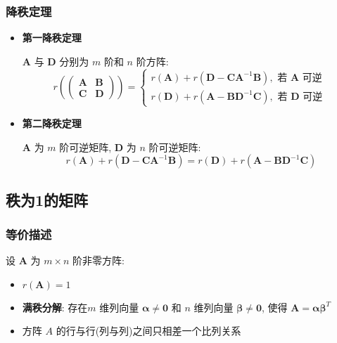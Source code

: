\documentclass{article}
\begin{document}
			\subsubsection{降秩定理}
				\begin{itemize}
					\item \textbf{第一降秩定理}

						$\boldsymbol{A}$ 与 $\boldsymbol{D}$ 分别为 $m$ 阶和 $n$ 阶方阵:
						$$
						r\left(\left(\begin{array}{ll}
							\boldsymbol{A} & \boldsymbol{B} \\
							\boldsymbol{C} & \boldsymbol{D}
						\end{array}\right)\right)=\left\{\begin{array}{l}
							r(\boldsymbol{A})+r\left(\boldsymbol{D}-\boldsymbol{C A}^{-1} \boldsymbol{B}\right), \text { 若 } \boldsymbol{A} \text { 可逆 } \\
							r(\boldsymbol{D})+r\left(\boldsymbol{A}-\boldsymbol{B} \boldsymbol{D}^{-1} \boldsymbol{C}\right), \text { 若 } \boldsymbol{D} \text { 可逆 }
						\end{array}\right.
						$$
					\item \textbf{第二降秩定理}

						$\boldsymbol{A}$ 为 $m$ 阶可逆矩阵, $\boldsymbol{D}$ 为 $n$ 阶可逆矩阵:
						$$
						r(\boldsymbol{A})+r\left(\boldsymbol{D}-\boldsymbol{C A}^{-1} \boldsymbol{B}\right)=r(\boldsymbol{D})+r\left(\boldsymbol{A}-\boldsymbol{B} 	\boldsymbol{D}^{-1} \boldsymbol{C}\right)
						$$
				\end{itemize}
		\subsection{秩为1的矩阵}
			\subsubsection{等价描述}
				设 $\boldsymbol A$ 为 $m \times n$ 阶非零方阵:
				\begin{itemize}
					\item $r(\boldsymbol A)=1$
					\item \textbf{满秩分解}: 存在$m$ 维列向量 $\boldsymbol \alpha\neq\mathbf0$ 和 $n$ 维列向量 $\boldsymbol \beta\neq\mathbf0$, 使得 $\boldsymbol A=\boldsymbol \alpha \boldsymbol \beta^{T}$
					\item 方阵 $A$ 的行与行(列与列)之间只相差一个比列关系
				\end{itemize}
\end{document}
